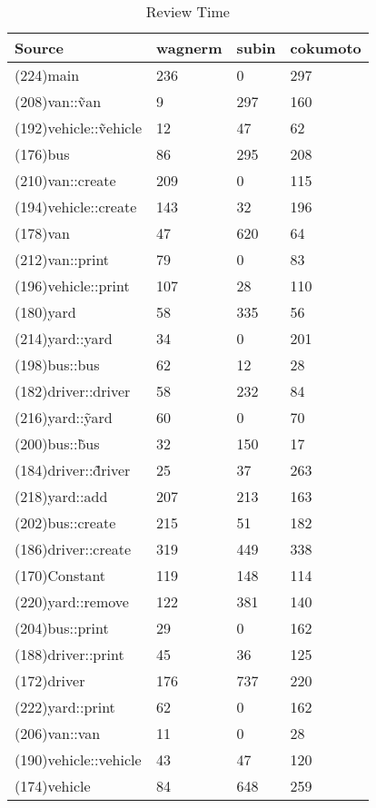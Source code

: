 \begin{table}[hb]
\begin{center}
\begin{tabular}{|l|l|l|l|}
\hline
Source & wagnerm & subin & cokumoto\\
\hline
(224)main & 236 & 0 & 297\\
(208)van::\~van & 9 & 297 & 160\\
(192)vehicle::\~vehicle & 12 & 47 & 62\\
(176)bus & 86 & 295 & 208\\
(210)van::create & 209 & 0 & 115\\
(194)vehicle::create & 143 & 32 & 196\\
(178)van & 47 & 620 & 64\\
(212)van::print & 79 & 0 & 83\\
(196)vehicle::print & 107 & 28 & 110\\
(180)yard & 58 & 335 & 56\\
(214)yard::yard & 34 & 0 & 201\\
(198)bus::bus & 62 & 12 & 28\\
(182)driver::driver & 58 & 232 & 84\\
(216)yard::\~yard & 60 & 0 & 70\\
(200)bus::\~bus & 32 & 150 & 17\\
(184)driver::\~driver & 25 & 37 & 263\\
(218)yard::add & 207 & 213 & 163\\
(202)bus::create & 215 & 51 & 182\\
(186)driver::create & 319 & 449 & 338\\
(170)Constant & 119 & 148 & 114\\
(220)yard::remove & 122 & 381 & 140\\
(204)bus::print & 29 & 0 & 162\\
(188)driver::print & 45 & 36 & 125\\
(172)driver & 176 & 737 & 220\\
(222)yard::print & 62 & 0 & 162\\
(206)van::van & 11 & 0 & 28\\
(190)vehicle::vehicle & 43 & 47 & 120\\
(174)vehicle & 84 & 648 & 259\\
\hline
\end{tabular}
\end{center}
\caption{Review Time}
\end{table}


